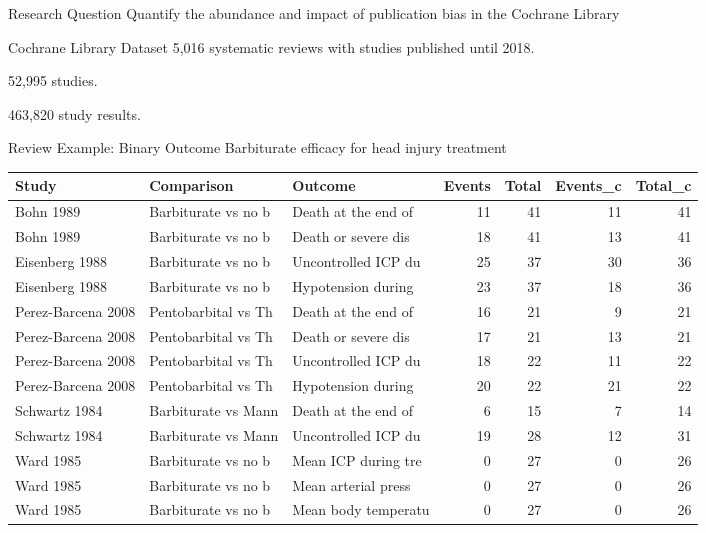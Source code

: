 \documentclass[english]{beamer}\usepackage[]{graphicx}\usepackage[]{color}
\begin{document}
\begin{frame}{Research Question}
Quantify the abundance and impact of publication bias in the Cochrane Library
\end{frame}


\begin{frame}{Cochrane Library Dataset}
5,016 systematic reviews with studies published until 2018.

52,995 studies.

463,820 study results.
\end{frame}


\begin{frame}[fragile]{Review Example: Binary Outcome}
Barbiturate efficacy for head injury treatment
\vspace{-5mm}
\begin{table}[ht]
\centering
\begingroup\tiny
\begin{tabular}{lllrrrr}
  \hline
Study & Comparison & Outcome & Events & Total & Events\_c & Total\_c \\ 
  \hline
Bohn 1989 & Barbiturate vs no b & Death at the end of & 11 & 41 & 11 & 41 \\ 
  Bohn 1989 & Barbiturate vs no b & Death or severe dis & 18 & 41 & 13 & 41 \\ 
  Eisenberg 1988 & Barbiturate vs no b & Uncontrolled ICP du & 25 & 37 & 30 & 36 \\ 
  Eisenberg 1988 & Barbiturate vs no b & Hypotension during  & 23 & 37 & 18 & 36 \\ 
  Perez-Barcena 2008 & Pentobarbital vs Th & Death at the end of & 16 & 21 & 9 & 21 \\ 
  Perez-Barcena 2008 & Pentobarbital vs Th & Death or severe dis & 17 & 21 & 13 & 21 \\ 
  Perez-Barcena 2008 & Pentobarbital vs Th & Uncontrolled ICP du & 18 & 22 & 11 & 22 \\ 
  Perez-Barcena 2008 & Pentobarbital vs Th & Hypotension during  & 20 & 22 & 21 & 22 \\ 
  Schwartz 1984 & Barbiturate vs Mann & Death at the end of & 6 & 15 & 7 & 14 \\ 
  Schwartz 1984 & Barbiturate vs Mann & Uncontrolled ICP du & 19 & 28 & 12 & 31 \\ 
  Ward 1985 & Barbiturate vs no b & Mean ICP during tre & 0 & 27 & 0 & 26 \\ 
  Ward 1985 & Barbiturate vs no b & Mean arterial press & 0 & 27 & 0 & 26 \\ 
  Ward 1985 & Barbiturate vs no b & Mean body temperatu & 0 & 27 & 0 & 26 \\ 
   \hline
\end{tabular}
\endgroup
\label{barbiturates}
\end{table}

\end{frame}
\end{document}
